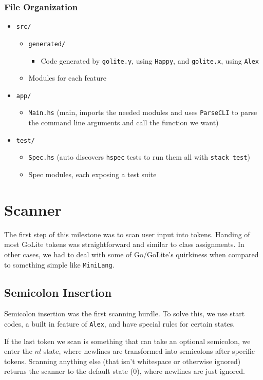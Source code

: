\documentclass[11pt]{article}
\begin{document}
\subsubsection{File Organization}
\label{sec:org9c46021}
\begin{itemize}
\item \texttt{src/}
\begin{itemize}
\item \texttt{generated/}
\begin{itemize}
\item Code generated by \texttt{golite.y}, using \texttt{Happy}, and \texttt{golite.x}, using \texttt{Alex}
\end{itemize}
\item Modules for each feature
\end{itemize}
\item \texttt{app/}
\begin{itemize}
\item \texttt{Main.hs} (main, imports the needed modules and uses
\texttt{ParseCLI} to parse the command line arguments and call the
function we want)
\end{itemize}
\item \texttt{test/}
\begin{itemize}
\item \texttt{Spec.hs} (auto discovers \texttt{hspec} tests to run them all with
\texttt{stack test})
\item Spec modules, each exposing a test suite
\end{itemize}
\end{itemize}
\section{Scanner}
\label{sec:orge169f0d}
The first step of this milestone was to scan user input into
tokens. Handing of most GoLite tokens was straightforward and
similar to class assignments. In other cases, we had to deal with
some of Go/GoLite's quirkiness when compared to something simple
like \texttt{MiniLang}.
\subsection{Semicolon Insertion}
\label{sec:orgfb82096}
Semicolon insertion was the first scanning hurdle. To solve
this, we use start codes, a built in feature of \texttt{Alex}, and have
special rules for certain states.

If the last token we scan is something that can take an optional
semicolon, we enter the \(nl\) state, where newlines are transformed into
semicolons after specific tokens. Scanning anything else (that isn't
whitespace or otherwise ignored) returns the scanner to the default
state (\(0\)), where newlines are just ignored.
\end{document}
